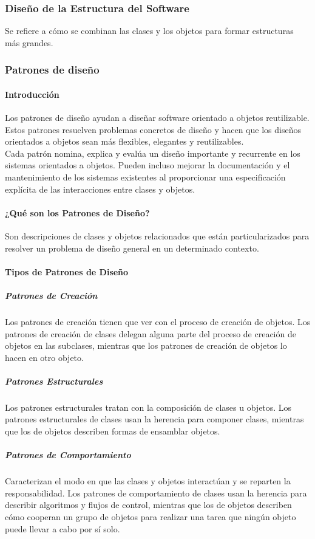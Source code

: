 \subsubsection{Diseño de la Estructura del Software}
Se refiere a cómo se combinan las clases y los objetos para formar estructuras más grandes.
\subsubsection{Patrones de diseño}
\paragraph{Introducción}
Los patrones de diseño ayudan a diseñar software orientado a objetos reutilizable. Estos patrones resuelven problemas concretos de diseño y hacen que los diseños orientados a objetos sean más flexibles, elegantes y reutilizables.\\
Cada patrón nomina, explica y evalúa un diseño importante y recurrente en los sistemas orientados a objetos. Pueden incluso mejorar la documentación y el mantenimiento de los sistemas existentes al proporcionar una especificación explícita de las interacciones entre clases y objetos.
\paragraph{¿Qué son los Patrones de Diseño?}
Son descripciones de clases y objetos relacionados que están particularizados para resolver un problema de diseño general en un determinado contexto.
\paragraph{Tipos de Patrones de Diseño}
\subparagraph{Patrones de Creación}
Los patrones de creación tienen que ver con el proceso de creación de objetos. Los patrones de creación de clases delegan alguna parte del proceso de creación de objetos en las subclases, mientras que los patrones de creación de objetos lo hacen en otro objeto. 
\subparagraph{Patrones Estructurales}
Los patrones estructurales tratan con la composición de clases u objetos. Los patrones estructurales de clases usan la herencia para componer clases, mientras que los de objetos describen formas de ensamblar objetos.
\subparagraph{Patrones de Comportamiento}
Caracterizan el modo en que las clases y objetos interactúan y se reparten la responsabilidad. Los patrones de comportamiento de clases usan la herencia para describir algoritmos y flujos de control, mientras que los de objetos describen cómo cooperan un grupo de objetos para realizar una tarea que ningún objeto puede llevar a cabo por sí solo.
